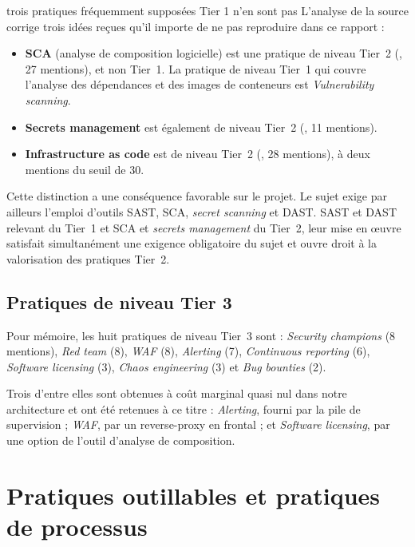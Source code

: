 \begin{constat}{trois pratiques fréquemment supposées Tier 1 n'en sont pas}
L'analyse de la source corrige trois idées reçues qu'il importe de ne pas
reproduire dans ce rapport :

\begin{itemize}
  \item \textbf{SCA} (analyse de composition logicielle) est une pratique de
  niveau Tier~2 (, 27 mentions), et non Tier~1. La pratique de niveau
  Tier~1 qui couvre l'analyse des dépendances et des images de conteneurs est
   \emph{Vulnerability scanning}.
  \item \textbf{Secrets management} est également de niveau Tier~2
  (, 11 mentions).
  \item \textbf{Infrastructure as code} est de niveau Tier~2 (,
  28 mentions), à deux mentions du seuil de 30.
\end{itemize}

Cette distinction a une conséquence favorable sur le projet. Le sujet exige par
ailleurs l'emploi d'outils SAST, SCA, \emph{secret scanning} et DAST. SAST et
DAST relevant du Tier~1 et SCA et \emph{secrets management} du Tier~2, leur
mise en œuvre satisfait simultanément une exigence obligatoire du sujet et
ouvre droit à la valorisation des pratiques Tier~2.
\end{constat}

\subsection{Pratiques de niveau Tier 3}

Pour mémoire, les huit pratiques de niveau Tier~3 sont : \emph{Security
champions} (8 mentions), \emph{Red team} (8), \emph{WAF} (8),
\emph{Alerting} (7), \emph{Continuous reporting} (6), \emph{Software
licensing} (3), \emph{Chaos engineering} (3) et \emph{Bug bounties} (2).

Trois d'entre elles sont obtenues à coût marginal quasi nul dans notre
architecture et ont été retenues à ce titre : \emph{Alerting}, fourni par la
pile de supervision ; \emph{WAF}, par un reverse-proxy en frontal ; et
\emph{Software licensing}, par une option de l'outil d'analyse de composition.

\section{Pratiques outillables et pratiques de processus}
\label{sec:pratiques-non-outillables}

